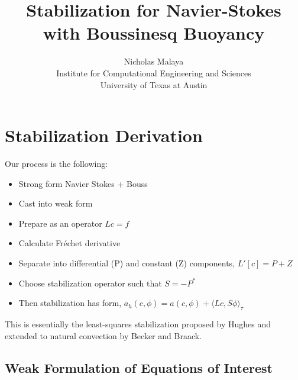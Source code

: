 \documentclass{article}
\title{\bf{Stabilization for Navier-Stokes with Boussinesq Buoyancy}}
\author{Nicholas Malaya \\ Institute for Computational Engineering and Sciences \\ University of Texas at Austin} \date{}
\begin{document}
\maketitle

\section{Stabilization Derivation}
%
%
Our process is the following: 

\begin{itemize}
 \item Strong form Navier Stokes + Bouss
 \item Cast into weak form
 \item Prepare as an operator $Lc=f$
 \item Calculate Fr\'echet derivative
 \item Separate into differential (P) and constant (Z) components,
       $L'[c] = P + Z$
 \item Choose stabilization operator such that $S = -P^*$
 \item Then stabilization has form, $a_h(c,\phi) = a(c,\phi) + \langle
       Lc,S\phi \rangle_\tau$
\end{itemize}

This is essentially the least-squares stabilization proposed by Hughes
and extended to natural convection by Becker and Braack. 

%
%
\newpage

\subsection{Weak Formulation of Equations of Interest}
\end{document}
